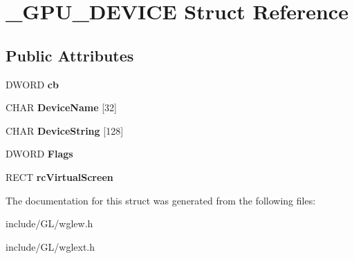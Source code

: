 \hypertarget{struct__GPU__DEVICE}{\section{\-\_\-\-G\-P\-U\-\_\-\-D\-E\-V\-I\-C\-E \-Struct \-Reference}
\label{struct__GPU__DEVICE}
}
\subsection*{\-Public \-Attributes}
\begin{DoxyCompactItemize}
\item 
\hypertarget{struct__GPU__DEVICE_afcb22f16ba9e526610489ff56ab78ddb}{\-D\-W\-O\-R\-D {\bfseries cb}}\label{struct__GPU__DEVICE_afcb22f16ba9e526610489ff56ab78ddb}

\item 
\hypertarget{struct__GPU__DEVICE_acdb1f0d784d7527ec04163439eff9038}{\-C\-H\-A\-R {\bfseries \-Device\-Name} \mbox{[}32\mbox{]}}\label{struct__GPU__DEVICE_acdb1f0d784d7527ec04163439eff9038}

\item 
\hypertarget{struct__GPU__DEVICE_a50b7b6a8eb397001ada4f5f918cc8065}{\-C\-H\-A\-R {\bfseries \-Device\-String} \mbox{[}128\mbox{]}}\label{struct__GPU__DEVICE_a50b7b6a8eb397001ada4f5f918cc8065}

\item 
\hypertarget{struct__GPU__DEVICE_a008db9d0f5fc13a5160805f40465f14a}{\-D\-W\-O\-R\-D {\bfseries \-Flags}}\label{struct__GPU__DEVICE_a008db9d0f5fc13a5160805f40465f14a}

\item 
\hypertarget{struct__GPU__DEVICE_aeb573bbeb3b6c589246720ef259b9a27}{\-R\-E\-C\-T {\bfseries rc\-Virtual\-Screen}}\label{struct__GPU__DEVICE_aeb573bbeb3b6c589246720ef259b9a27}

\end{DoxyCompactItemize}


\-The documentation for this struct was generated from the following files\-:\begin{DoxyCompactItemize}
\item 
include/\-G\-L/wglew.\-h\item 
include/\-G\-L/wglext.\-h\end{DoxyCompactItemize}

